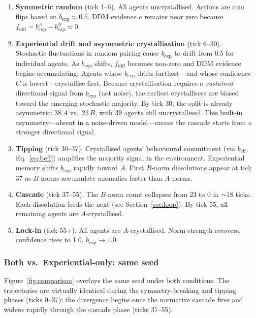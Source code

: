 \documentclass[11pt,a4paper]{article}
\begin{document}
\begin{enumerate}[nosep]
\item \textbf{Symmetric random} (tick 1--6). All agents uncrystallised. Actions are coin flips based on $b_{\exp} \approx 0.5$. DDM evidence $e$ remains near zero because $f_{\mathrm{diff}} = b_{\exp}^A - b_{\exp}^B \approx 0$.

\item \textbf{Experiential drift and asymmetric crystallisation} (tick 6--30). Stochastic fluctuations in random pairing cause $b_{\exp}$ to drift from 0.5 for individual agents. As $b_{\exp}$ shifts, $f_{\mathrm{diff}}$ becomes non-zero and DDM evidence begins accumulating. Agents whose $b_{\exp}$ drifts furthest---and whose confidence $C$ is lowest---crystallise first. Because crystallisation requires a \emph{sustained} directional signal from $b_{\exp}$ (not noise), the earliest crystallisers are biased toward the emerging stochastic majority. By tick 30, the split is already asymmetric: 38\,$A$ vs.\ 23\,$B$, with 39 agents still uncrystallised. This built-in asymmetry---absent in a noise-driven model---means the cascade starts from a stronger directional signal.

\item \textbf{Tipping} (tick 30--37). Crystallised agents' behavioural commitment (via $b_{\mathrm{eff}}$, Eq.~\ref{eq:beff}) amplifies the majority signal in the environment. Experiential memory shifts $b_{\exp}$ rapidly toward $A$. First $B$-norm dissolutions appear at tick 37 as $B$-norms accumulate anomalies faster than $A$-norms.

\item \textbf{Cascade} (tick 37--55). The $B$-norm count collapses from 23 to 0 in $\sim$18 ticks. Each dissolution feeds the next (see Section~\ref{sec:loop}). By tick 55, all remaining agents are $A$-crystallised.

\item \textbf{Lock-in} (tick 55+). All agents are $A$-crystallised. Norm strength recovers, confidence rises to 1.0, $b_{\exp} \to 1.0$.
\end{enumerate}

\subsubsection{Both vs.\ Experiential-only: same seed}

Figure~\ref{fig:comparison} overlays the same seed under both conditions. The trajectories are virtually identical during the symmetry-breaking and tipping phases (ticks 0--37); the divergence begins once the normative cascade fires and widens rapidly through the cascade phase (ticks 37--55).
\end{document}
